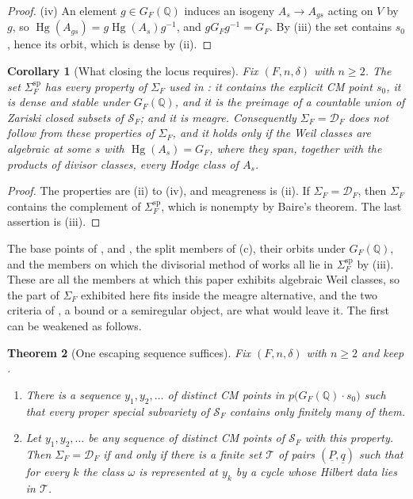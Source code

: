 \documentclass[11pt,reqno]{amsart}
\theoremstyle{plain}
\newtheorem{theorem}{Theorem}[section]
\newtheorem{corollary}[theorem]{Corollary}
\theoremstyle{definition}
\theoremstyle{remark}
\newcommand{\QQ}{\mathbb{Q}}
\newcommand{\cD}{\mathcal{D}}
\newcommand{\cS}{\mathcal{S}}
\DeclareMathOperator{\Hg}{Hg}
\begin{document}
\begin{proof}
(iv) An element $g\in G_{F}(\QQ)$ induces an isogeny $A_{s}\to A_{gs}$ acting
on $V$ by $g$, so $\Hg(A_{gs})=g\Hg(A_{s})g^{-1}$, and $gG_{F}g^{-1}=G_{F}$.
By (iii) the set contains $s_{0}$, hence its orbit, which is dense by
(ii).
\end{proof}

\begin{corollary}[What closing the locus requires]\label{cor:speciallocus}
Fix $(F,n,\delta)$ with $n\ge2$. The set $\Sigma^{\mathrm{sp}}_{F}$ has every
property of $\Sigma_{F}$ used in : it contains the explicit CM
point $s_{0}$, it is dense and stable under $G_{F}(\QQ)$, and it is the
preimage of a countable union of Zariski closed subsets of $\cS_{F}$; and it
is meagre. Consequently $\Sigma_{F}=\cD_{F}$ does not follow from these
properties of $\Sigma_{F}$, and it holds only if the Weil classes are
algebraic at some $s$ with $\Hg(A_{s})=G_{F}$, where they span, together with
the products of divisor classes, every Hodge class of $A_{s}$.
\end{corollary}

\begin{proof}
The properties are (ii) to (iv), and meagreness is
(ii). If $\Sigma_{F}=\cD_{F}$, then $\Sigma_{F}$ contains the complement of
$\Sigma^{\mathrm{sp}}_{F}$, which is nonempty by Baire's theorem. The last
assertion is (iii).
\end{proof}

The base points of ,  and
, the split members of (c), their orbits
under $G_{F}(\QQ)$, and the members on which the divisorial method of
 works all lie in $\Sigma^{\mathrm{sp}}_{F}$ by
(iii). These are all the members at which this paper
exhibits algebraic Weil classes, so the part of $\Sigma_{F}$ exhibited here
fits inside the meagre alternative, and the two criteria of , a
bound or a semiregular object, are what would leave it. The first can be
weakened as follows.

\begin{theorem}[One escaping sequence suffices]\label{thm:escape}
Fix $(F,n,\delta)$ with $n\ge2$ and keep .
\begin{enumerate}[label=\textup{(\roman*)},leftmargin=2.6em,itemsep=2pt]
\item There is a sequence $y_{1},y_{2},\dots$ of distinct CM points in
  $p\bigl(G_{F}(\QQ)\cdot s_{0}\bigr)$ such that every proper special
  subvariety of $\cS_{F}$ contains only finitely many of them.
\item Let $y_{1},y_{2},\dots$ be any sequence of distinct CM points of
  $\cS_{F}$ with this property. Then $\Sigma_{F}=\cD_{F}$ if and only if there
  is a finite set $\mathcal{T}$ of pairs $(\underline{P},\underline{q})$ such
  that for every $k$ the class $\omega$ is represented at $y_{k}$ by a cycle
  whose Hilbert data lies in $\mathcal{T}$.
\end{enumerate}
\end{theorem}
\end{document}
